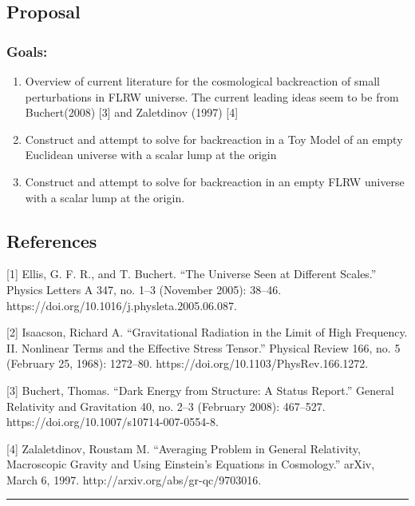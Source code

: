 \hypertarget{proposal}{%
\subsection{Proposal}\label{proposal}}

\hypertarget{goals}{%
\subsubsection{Goals:}\label{goals}}

\begin{enumerate}
\def\labelenumi{\arabic{enumi}.}
\tightlist
\item
  Overview of current literature for the cosmological backreaction of
  small perturbations in FLRW universe. The current leading ideas seem
  to be from Buchert(2008) {[}3{]} and Zaletdinov (1997) {[}4{]}
\item
  Construct and attempt to solve for backreaction in a Toy Model of an
  empty Euclidean universe with a scalar lump at the origin
\item
  Construct and attempt to solve for backreaction in an empty FLRW
  universe with a scalar lump at the origin.
\end{enumerate}

\hypertarget{references}{%
\subsection{References}\label{references}}

{[}1{]} Ellis, G. F. R., and T. Buchert. ``The Universe Seen at
Different Scales.'' Physics Letters A 347, no. 1--3 (November 2005):
38--46. https://doi.org/10.1016/j.physleta.2005.06.087.

{[}2{]} Isaacson, Richard A. ``Gravitational Radiation in the Limit of
High Frequency. II. Nonlinear Terms and the Effective Stress Tensor.''
Physical Review 166, no. 5 (February 25, 1968): 1272--80.
https://doi.org/10.1103/PhysRev.166.1272.

{[}3{]} Buchert, Thomas. ``Dark Energy from Structure: A Status
Report.'' General Relativity and Gravitation 40, no. 2--3 (February
2008): 467--527. https://doi.org/10.1007/s10714-007-0554-8.

{[}4{]} Zalaletdinov, Roustam M. ``Averaging Problem in General
Relativity, Macroscopic Gravity and Using Einstein's Equations in
Cosmology.'' arXiv, March 6, 1997. http://arxiv.org/abs/gr-qc/9703016.

\begin{center}\rule{0.5\linewidth}{0.5pt}\end{center}
